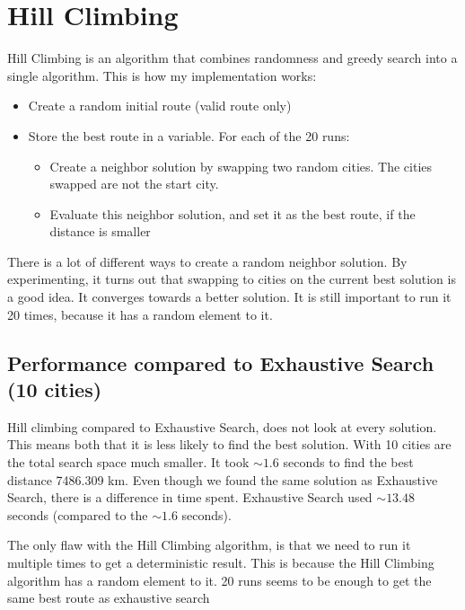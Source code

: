 \documentclass{article}
\begin{document}
    \section{Hill Climbing}

    Hill Climbing is an algorithm that combines randomness and greedy search into a single algorithm.
    This is how my implementation works:
    \begin{itemize}
        \item Create a random initial route (valid route only)
        \item Store the best route in a variable. For each of the 20 runs: 
        \begin{itemize}
            \item Create a neighbor solution by swapping two random cities. The cities swapped are not the start city. 
            \item Evaluate this neighbor solution, and set it as the best route, if the distance is smaller
        \end{itemize}
    \end{itemize}


    There is a lot of different ways to create a random neighbor solution. By experimenting, it turns out that swapping to cities on the current best solution is a good idea. 
    It converges towards a better solution. It is still important to run it 20 times, because it has a random element to it. 

    \subsection{Performance compared to Exhaustive Search (10 cities)}

    Hill climbing compared to Exhaustive Search, does not look at every solution. This means both that it is less likely to find the best solution.
    With 10 cities are the total search space much smaller. It took $\sim1.6$ seconds to find the best distance 7486.309 km. Even though we found the same solution as Exhaustive Search, there is a difference in time spent.
    Exhaustive Search used  $\sim13.48$ seconds (compared to the   $\sim1.6$ seconds).

    The only flaw with the Hill Climbing algorithm, is that we need to run it multiple times to get a deterministic result. This is because the Hill Climbing algorithm has a random element to it. 
    20 runs seems to be enough to get the same best route as exhaustive search 
\end{document}
